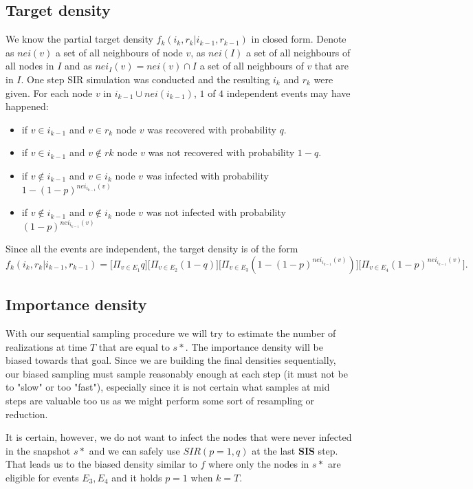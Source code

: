 \documentclass[times, utf8, diplomski]{fer}
\begin{document}
\subsection{Target density}
We know the partial target density $f_k(i_k, r_k | i_{k - 1}, r_{k - 1})$ in closed form. Denote as $nei(v)$ a set of all neighbours of node $v$, as $nei(I)$ a set of all neighbours of all nodes in $I$ and as $nei_I(v) = nei(v) \cap I$ a set of all neighbours of $v$ that are in $I$. One step SIR simulation was conducted and the resulting $i_k$ and $r_k$ were given. For each node $v$ in $i_{k - 1} \cup nei(i_{k - 1})$, $1$ of $4$ independent events may have happened:
\begin{itemize}
\item{if $v \in i_{k - 1}$ and $v \in r_{k}$ node $v$ was recovered with probability $q$.}
\item{if $v \in i_{k - 1}$ and $v \not\in r{k}$ node $v$ was not recovered with probability $1 - q$.}
\item{if $v \not\in i_{k - 1}$ and $v \in i_{k}$ node $v$ was infected with probability $1 - (1 - p) ^ {nei_{i_{k-1}}(v)}$}
\item{if $v \not\in i_{k - 1}$ and $v \not \in i_{k}$ node $v$ was not infected with probability $(1 - p)^{nei_{i_{k-1}}(v)}$}
\end{itemize}

Since all the events are independent, the target density is of the form
\begin{equation*}
f_k(i_k, r_k | i_{k - 1}, r_{k - 1}) = \big[\Pi_{v \in E_1} q\big]\big[ \Pi_{v \in E_2} (1 - q)\big]\big[\Pi_{v \in E_3} (1 - (1 - p) ^ {nei_{i_{k-1}}(v)})\big]\big[\Pi_{v \in E_4} (1 - p)^{nei_{i_{k-1}}(v)} \big].
\end{equation*}

\subsection{Importance density}
With our sequential sampling procedure we will try to estimate the number of realizations at time $T$ that are equal to $s*$. The importance density will be biased towards that goal. Since we are building the final densities sequentially, our biased sampling must sample reasonably enough at each step (it must not be to "slow" or too "fast"), especially since it is not certain what samples at mid steps are valuable too us as we might perform some sort of  resampling or reduction.

It is certain, however, we do not want to infect the nodes that were never infected in the snapshot $s*$ and we can safely use $SIR(p = 1, q)$ at the last \textbf{SIS} step. That leads us to the biased density similar to $f$ where only the nodes in $s*$ are eligible for events $E_3, E_4$ and it holds $p = 1$ when $k = T$.
\end{document}
